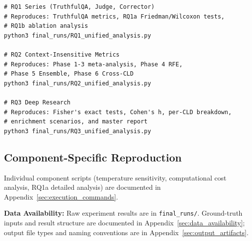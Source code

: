\begin{verbatim}
# RQ1 Series (TruthfulQA, Judge, Corrector)
# Reproduces: TruthfulQA metrics, RQ1a Friedman/Wilcoxon tests,
# RQ1b ablation analysis
python3 final_runs/RQ1_unified_analysis.py

# RQ2 Context-Insensitive Metrics
# Reproduces: Phase 1-3 meta-analysis, Phase 4 RFE,
# Phase 5 Ensemble, Phase 6 Cross-CLD
python3 final_runs/RQ2_unified_analysis.py

# RQ3 Deep Research
# Reproduces: Fisher's exact tests, Cohen's h, per-CLD breakdown,
# enrichment scenarios, and master report
python3 final_runs/RQ3_unified_analysis.py
\end{verbatim}

\subsection{Component-Specific Reproduction}

Individual component scripts (temperature sensitivity, computational cost analysis, RQ1a detailed analysis) are documented in Appendix~\ref{sec:execution_commands}.

\textbf{Data Availability:} Raw experiment results are in \texttt{final\_runs/}. Ground-truth inputs and result structure are documented in Appendix~\ref{sec:data_availability}; output file types and naming conventions are in Appendix~\ref{sec:output_artifacts}.